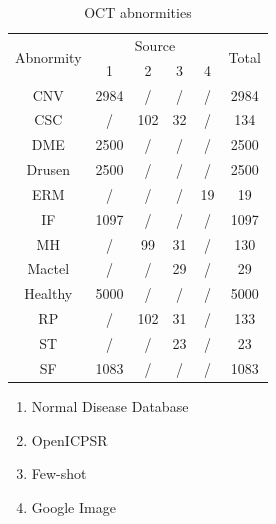 \documentclass{article}
\begin{document}
	\begin{minipage}[t]{0.4\linewidth}
		{
			\fontsize{9}{12}\selectfont
			{
				\begin{longtable}{cccccc}
					\caption{OCT abnormities}
					\label{tb:OCT_source}\\
					\toprule
					\multirow{2}{*}{Abnormity}&\multicolumn{4}{c}{Source}&\multirow{2}{*}{Total}\\
					&1&2&3&4&\\
					\midrule
					CNV    &2984&/  &/ &/ &2984\\
					CSC    &/   &102&32&/ &134 \\
					DME    &2500&/  &/ &/ &2500\\
					Drusen &2500&/  &/ &/ &2500\\
					ERM    &/   &/  &/ &19&19  \\
					IF     &1097&/  &/ &/ &1097\\
					MH     &/   &99 &31&/ &130 \\
					Mactel &/   &/  &29&/ &29  \\
					Healthy&5000&/  &/ &/ &5000\\
					RP     &/   &102&31&/ &133 \\
					ST     &/   &/  &23&/ &23  \\
					SF     &1083&/  &/ &/ &1083\\
					\bottomrule
				\end{longtable}
				
				\vspace{0.5cm}
				\begin{enumerate}
					\item Normal Disease Database
					\vspace{-0.2cm}
					
					\item OpenICPSR
					\vspace{-0.2cm}
					
					\item Few-shot
					\vspace{-0.2cm}
					
					\item Google Image
					\vspace{-0.2cm}
				\end{enumerate}
				
				\vspace{0.5cm}
			}
		}
	\end{minipage}
\end{document}
